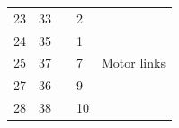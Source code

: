 \documentclass[12pt,a4paper,oneside]{article}
\begin{document}
\begin{spacing}{1.15}
\begin{table}[h]
\begin{tabular}{lllll}
		23                                                                                                                      & 33                                                                                                                 &                                                        & 2                                                                                                                  &                                                                                                            \\
		24                                                                                                                      & 35                                                                                                                 &                                                        & 1                                                                                                                  &                                                                                                            \\
		25                                                                                                                      & 37                                                                                                                 &                                                        & 7                                                                                                                  & \multirow{-3}{*}{Motor links}                                                                              \\
		\rowcolor[HTML]{C0C0C0} 
		27                                                                                                                      & 36                                                                                                                 &                                                        & 9                                                                                                                  & \cellcolor[HTML]{C0C0C0}                                                                                   \\
		\rowcolor[HTML]{C0C0C0} 
		28                                                                                                                      & 38                                                                                                                 &                                                        & 10                                                                                                                 & \cellcolor[HTML]{C0C0C0}                                                                                   \\

\end{tabular}
\end{table}
\end{spacing}
\end{document}
